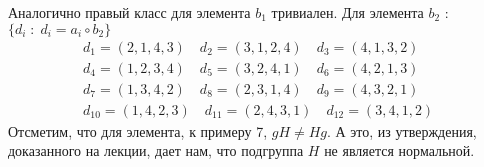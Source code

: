 \documentclass[a4paper,11pt]{article}
\begin{document}
Аналогично правый класс для элемента $ b_1 $ тривиален. Для элемента $ b_2 $ : $ \{ d_i \; : \; d_i = a_i \circ b_2 \}  $
\begin{align*}
&d_{1} = ( 2, 1, 4, 3 ) \quad 
d_{2} = ( 3, 1, 2, 4 ) \quad 
d_{3} = ( 4, 1, 3, 2 ) \quad  \\
&d_{4} = ( 1, 2, 3, 4 ) \quad 
d_{5} = ( 3, 2, 4, 1 ) \quad 
d_{6} = ( 4, 2, 1, 3 ) \quad  \\
&d_{7} = ( 1, 3, 4, 2 ) \quad 
d_{8} = ( 2, 3, 1, 4 ) \quad 
d_{9} = ( 4, 3, 2, 1 ) \quad  \\
&d_{10} = ( 1, 4, 2, 3 ) \quad 
d_{11} = ( 2, 4, 3, 1 ) \quad 
d_{12} = ( 3, 4, 1, 2 ) \quad
\end{align*}
Отсметим, что для элемента, к примеру 7, $ gH \neq Hg $. А это, из утверждения, доказанного на лекции, дает нам, что подгруппа $ H $  не является нормальной.
\newpage



\end{document}
